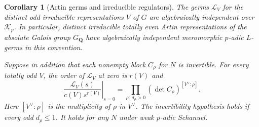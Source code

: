 \documentclass[11pt]{amsart}
\numberwithin{equation}{section}
\newtheorem{corollary}[theorem]{Corollary}
\theoremstyle{definition}
\theoremstyle{remark}
\newcommand{\Q}{\mathbf Q}
\begin{document}
\begin{corollary}[Artin germs and irreducible regulators]\label{cor:artingerms}
The germs $\mathcal L_V$ for the distinct odd irreducible
representations $V$ of $G$ are algebraically independent over
$\mathcal K_p$. In particular, distinct irreducible totally even
Artin representations of the absolute Galois group $G_\Q$ have algebraically independent
meromorphic $p$-adic $L$-germs in this convention.

Suppose in addition that each nonempty block $C_\rho$ for $N$ is
invertible. For every totally odd $V$, the order of $\mathcal L_V$
at zero is $r(V)$ and
\begin{equation}\label{eq:allartinleading}
 \left.\frac{\mathcal L_V(s)}{c(V)s^{r(V)}}\right|_{s=0}
   =\prod_{\rho:\,d_\rho>0}(\det C_\rho)^{[V^\vee:\rho]} .
\end{equation}
Here $[V^\vee:\rho]$ is the multiplicity of $\rho$ in $V^\vee$.
The invertibility hypothesis holds if every odd $d_\rho\le1$.
It holds for any $N$ under weak $p$-adic Schanuel.
\end{corollary}
\end{document}
